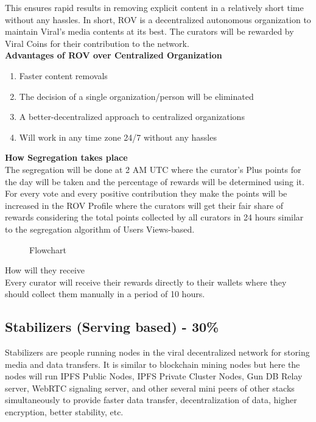 \documentclass[10pt]{article}
\begin{document}
This ensures rapid results in removing explicit content in a relatively short time without any hassles. In short, ROV is a decentralized autonomous organization to maintain Viral's media contents at its best. The curators will be rewarded by Viral Coins for their contribution to the network.\\

\textbf{Advantages of ROV over Centralized Organization}
\begin{enumerate}[leftmargin=+0.2in]
\item Faster content removals
\item The decision of a single organization/person will be eliminated
\item A better-decentralized approach to centralized organizations
\item Will work in any time zone 24/7 without any hassles
\end{enumerate}


\textbf{How Segregation takes place}\\

The segregation will be done at 2 AM UTC where the curator's Plus points for the day will be taken and the percentage of rewards will be determined using it. For every vote and every positive contribution they make the points will be increased in the ROV Profile where the curators will get their fair share of rewards considering the total points collected by all curators in 24 hours similar to the segregation algorithm of Users Views-based.\\

\begin{figure}[H]
\begin{center}
\caption{Flowchart}
\end{center}
\end{figure}

How will they receive\\

Every curator will receive their rewards directly to their wallets where they should collect them manually in a period of 10 hours.\\

\subsection{Stabilizers (Serving based) - 30\%}

Stabilizers are people running nodes in the viral decentralized network for storing media and data transfers. It is similar to blockchain mining nodes but here the nodes will run IPFS Public Nodes, IPFS Private Cluster Nodes, Gun DB Relay server, WebRTC signaling server, and other several mini peers of other stacks simultaneously to provide faster data transfer, decentralization of data, higher encryption, better stability, etc. \\
\end{document}
